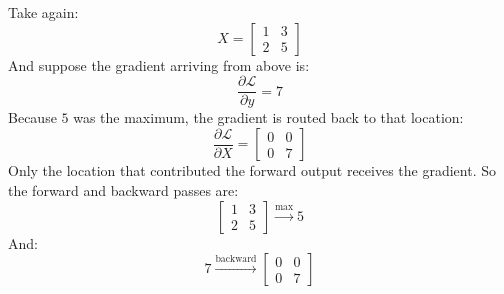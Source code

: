 \highspace
\begin{examplebox}
    Take again:
    \begin{equation*}
        X=
        \begin{bmatrix}
            1 & 3\\
            2 & 5
        \end{bmatrix}
    \end{equation*}
    And suppose the gradient arriving from above is:
    \begin{equation*}
        \frac{\partial\mathcal L}{\partial y}=7
    \end{equation*}
    Because \(5\) was the maximum, the gradient is routed back to that location:
    \begin{equation*}
        \frac{\partial\mathcal L}{\partial X}
        =
        \begin{bmatrix}
            0 & 0\\
            0 & 7
        \end{bmatrix}
    \end{equation*}
    Only the location that contributed the forward output receives the gradient.
    So the forward and backward passes are:
    \begin{equation*}
        \begin{bmatrix}
            1 & 3\\
            2 & \boxed{5}
        \end{bmatrix}
        \overset{\text{max}}{\longrightarrow}
        5
    \end{equation*}
    And:
    \begin{equation*}
        7
        \overset{\text{backward}}{\longrightarrow}
        \begin{bmatrix}
            0 & 0\\
            0 & \boxed{7}
        \end{bmatrix}
    \end{equation*}
\end{examplebox}

